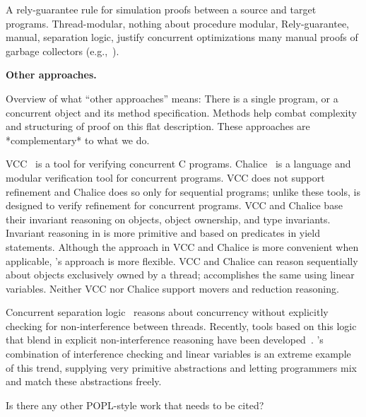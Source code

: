 A rely-guarantee rule for simulation proofs between a source and
target programs. 
Thread-modular, nothing about procedure modular, 
Rely-guarantee, manual, separation logic, justify concurrent optimizations
many manual proofs of garbage collectors (e.g.,~\cite{LiangRGSim}). 


{\bf Other approaches.}

Overview of what ``other approaches'' means: There is a single
program, or a concurrent object and its method specification. Methods
help combat complexity and structuring of proof on this flat
description. These approaches are *complementary* to what we do.

VCC~\cite{VCC} is a tool for verifying concurrent C programs.  
Chalice~\cite{LM09} is a language and modular verification tool for concurrent programs. 
VCC does not support refinement and Chalice does so only for sequential programs;
unlike these tools, \civl is designed to verify refinement for concurrent programs.  
VCC and Chalice base their invariant reasoning on objects, object ownership, and type invariants. 
Invariant reasoning in \civl is more primitive and based on predicates in yield statements. 
Although the approach in VCC and Chalice is more convenient when applicable, \civl's approach is more flexible. 
VCC and Chalice can reason sequentially about objects exclusively owned by a thread;
\civl accomplishes the same using linear variables.
Neither VCC nor Chalice support movers and reduction reasoning.

Concurrent separation logic~\cite{OHearn07} reasons about concurrency without 
explicitly checking for non-interference between threads. 
Recently, tools based on this logic that blend in explicit non-interference reasoning have been developed~\cite{SAGL,RGSep}. 
\civl's combination of interference checking and linear variables is an extreme example of this trend,
supplying very primitive abstractions and letting programmers mix and match these abstractions freely.

Is there any other POPL-style work that needs to be cited?


